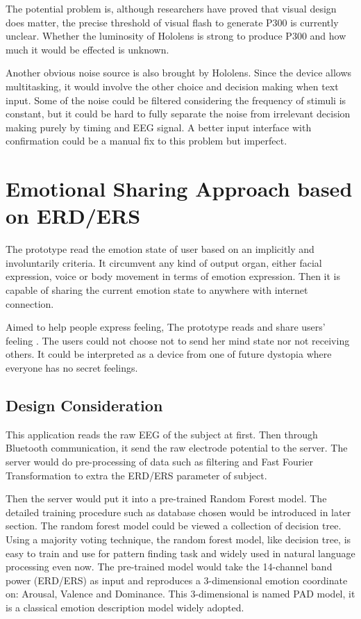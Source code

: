 \documentclass[a4paper]{article}
\begin{document}
The potential problem is, although researchers have proved that visual design does matter\autocite{sakai2012alphabet}, the precise threshold of visual flash to generate P300 is currently unclear. Whether the luminosity of Hololens is strong to produce P300 and how much it would be effected is unknown.

Another obvious noise source is also brought by Hololens. Since the device allows multitasking, it would involve the other choice and decision making when text input. Some of the noise could be filtered considering the frequency of stimuli is constant, but it could be hard to fully separate the noise from irrelevant decision making purely by timing and EEG signal. A better input interface with confirmation could be a manual fix to this problem but imperfect.  

\section{Emotional Sharing Approach based on ERD/ERS}

The prototype read the emotion state of user based on an implicitly and involuntarily criteria. It circumvent any kind of output organ, either facial expression, voice or body movement in terms of emotion expression. Then it is capable of sharing the current emotion state to anywhere with internet connection.

Aimed to help people express feeling, The prototype reads and share users' feeling . The users could not choose not to send her mind state nor not receiving others. It could be interpreted as a device from one of future dystopia where everyone has no secret feelings.

\subsection{Design Consideration}

This application reads the raw EEG of the subject at first. Then through Bluetooth communication, it send the raw electrode potential to the server. The server would do pre-processing of data such as filtering and Fast Fourier Transformation to extra the ERD/ERS parameter of subject.

Then the server would put it into a pre-trained Random Forest model. The detailed training procedure such as database chosen would be introduced in later section. The random forest model could be viewed a collection of decision tree. Using a majority voting technique, the random forest model, like decision tree, is easy to train and use for pattern finding task and widely used in natural language processing even now. The pre-trained model would take the 14-channel band power (ERD/ERS) as input and reproduces a 3-dimensional emotion coordinate on: Arousal, Valence and Dominance. This 3-dimensional is named PAD model, it is a classical emotion description model widely adopted.\autocite{bakker2014pleasure}
\end{document}
